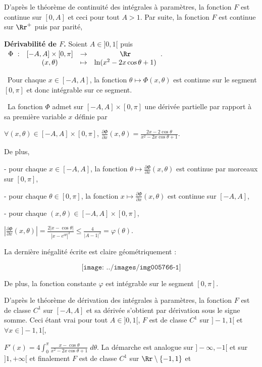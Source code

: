 {\begin{enumerate}
{D'après le théorème de continuité des intégrales à paramètres, la fonction $F$ est continue sur $[0,A]$ et ceci pour tout $A>1$. Par suite, la fonction $F$ est continue sur $\Rr^+$ puis par parité,

\begin{center}
\end{center}
 

\textbf{Dérivabilité de $F$.} Soient $A\in]0,1[$ puis  $\begin{array}[t]{cccc}
\Phi~:&[-A,A]\times[0,\pi]&\rightarrow&\Rr\\
 &(x,\theta)&\mapsto&\ln(x^2-2x\cos\theta+1)
\end{array}$.

\textbullet~Pour chaque $x\in[-A,A]$, la fonction $\theta\mapsto \Phi(x,\theta)$ est continue sur le segment $[0,\pi]$ et donc intégrable sur ce segment.

\textbullet~La fonction $\Phi$ admet sur $[-A,A]\times[0,\pi]$ une dérivée partielle par rapport à sa première variable $x$ définie par

\begin{center}
$\forall(x,\theta)\in[-A,A]\times[0,\pi]$, $\frac{\partial \Phi}{\partial x}(x,\theta)=\frac{2x-2\cos\theta}{x^2-2x\cos\theta+1}$.
\end{center}

De plus,

- pour chaque $x\in[-A,A]$, la fonction $\theta\mapsto\frac{\partial \Phi}{\partial x}(x,\theta)$ est continue par morceaux sur $[0,\pi]$,

- pour chaque $\theta\in[0,\pi]$, la fonction $x\mapsto\frac{\partial \Phi}{\partial x}(x,\theta)$ est continue sur $[-A,A]$,

- pour chaque $(x,\theta)\in[-A,A]\times[0,\pi]$,

\begin{center}
$\left|\frac{\partial \Phi}{\partial x}(x,\theta)\right|=\frac{2|x-\cos\theta|}{|x-e^{i\theta}|^2}\leqslant\frac{4}{|A-1|^2}=\varphi(\theta)$.
\end{center}

La dernière inégalité écrite est claire géométriquement :


$$\texttt{[image: ../images/img005766-1]}$$


De plus, la fonction constante $\varphi$ est intégrable sur le segment $[0,\pi]$.

D'après le théorème de dérivation des intégrales à paramètres, la fonction $F$ est de classe $C^1$ sur $[-A,A]$ et sa dérivée s'obtient par dérivation sous le signe somme. Ceci étant vrai pour tout $A\in]0,1[$, $F$ est de classe $C^1$ sur $]-1,1[$ et $\forall x\in]-1,1[$, \rule[-4mm]{0mm}{0mm}$F'(x)=4\int_{0}^{\pi}\frac{x-\cos\theta}{x^2-2x\cos\theta+1}\;d\theta$. La démarche est analogue sur $]-\infty,-1[$ et sur $]1,+\infty[$ et finalement $F$ est de classe $C^1$ sur $\Rr\setminus\{-1,1\}$ et

}
\end{enumerate}}
